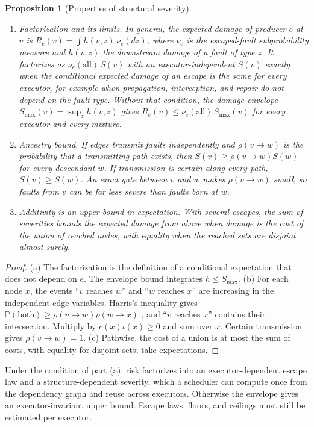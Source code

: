 \documentclass[11pt]{article}
\newtheorem{proposition}[theorem]{Proposition}
\theoremstyle{definition}
\theoremstyle{remark}
\newcommand{\Prb}{\mathbb P}
\begin{document}
\begin{proposition}[Properties of structural severity]\label{prop:severity}
\begin{enumerate}[label=(\alph*),itemsep=2pt]
\item \emph{Factorization and its limits.} In general, the expected damage of producer $e$ at $v$ is
$R_e(v)=\int h(v,z)\,\nu_e(dz)$, where $\nu_e$ is the escaped-fault subprobability measure and
$h(v,z)$ the downstream damage of a fault of type $z$. It factorizes as $\nu_e(\text{all})\,S(v)$ with
an executor-independent $S(v)$ exactly when the conditional expected damage of an escape is the same
for every executor, for example when propagation, interception, and repair do not depend on the
fault type. Without that condition, the \emph{damage envelope} $S_{\max}(v)=\sup_zh(v,z)$ gives
$R_e(v)\le\nu_e(\text{all})\,S_{\max}(v)$ for every executor and every mixture.
\item \emph{Ancestry bound.} If edges transmit faults independently and $\rho(v\to w)$ is the
probability that a transmitting path exists, then $S(v)\ge\rho(v\to w)S(w)$ for every descendant $w$.
If transmission is certain along every path, $S(v)\ge S(w)$. An exact gate between $v$ and $w$ makes
$\rho(v\to w)$ small, so faults from $v$ can be far less severe than faults born at $w$.
\item \emph{Additivity is an upper bound in expectation.} With several escapes, the sum of severities
bounds the expected damage from above when damage is the cost of the union of reached nodes, with
equality when the reached sets are disjoint almost surely.
\end{enumerate}
\end{proposition}
\begin{proof}
(a) The factorization is the definition of a conditional expectation that does not depend on $e$.
The envelope bound integrates $h\le S_{\max}$.
(b) For each node $x$, the events ``$v$ reaches $w$'' and ``$w$ reaches $x$'' are increasing in the
independent edge variables. Harris's inequality gives $\Prb(\text{both})\ge\rho(v\to w)\rho(w\to x)$
\cite{harris,fkg}, and ``$v$ reaches $x$'' contains their intersection. Multiply by $c(x)\iota(x)\ge0$
and sum over $x$. Certain transmission gives $\rho(v\to w)=1$.
(c) Pathwise, the cost of a union is at most the sum of costs, with equality for disjoint sets; take
expectations.
\end{proof}
Under the condition of part (a), risk factorizes into an executor-dependent escape law and a
structure-dependent severity, which a scheduler can compute once from the dependency graph and
reuse across executors. Otherwise the envelope gives an executor-invariant upper bound. Escape laws,
floors, and ceilings must still be estimated per executor.
\end{document}
